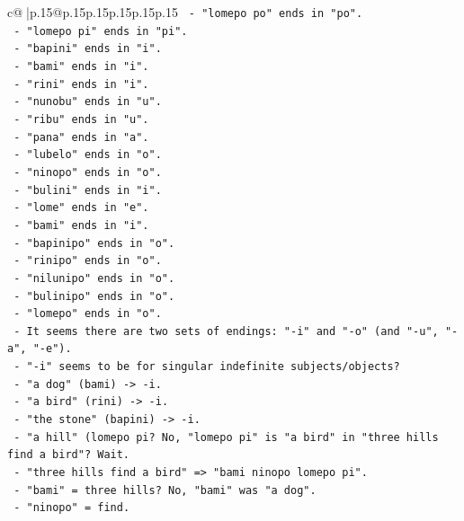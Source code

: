 \documentclass{article}
\begin{document}
{\begin{supertabular}{c@{$\;$}|p{.15\linewidth}@{}p{.15\linewidth}p{.15\linewidth}p{.15\linewidth}p{.15\linewidth}p{.15\linewidth}}
{{{\texttt{           {-} "lomepo po" ends in "po".} \\
\texttt{           {-} "lomepo pi" ends in "pi".} \\
\texttt{           {-} "bapini" ends in "i".} \\
\texttt{           {-} "bami" ends in "i".} \\
\texttt{           {-} "rini" ends in "i".} \\
\texttt{           {-} "nunobu" ends in "u".} \\
\texttt{           {-} "ribu" ends in "u".} \\
\texttt{           {-} "pana" ends in "a".} \\
\texttt{           {-} "lubelo" ends in "o".} \\
\texttt{           {-} "ninopo" ends in "o".} \\
\texttt{           {-} "bulini" ends in "i".} \\
\texttt{           {-} "lome" ends in "e".} \\
\texttt{           {-} "bami" ends in "i".} \\
\texttt{           {-} "bapinipo" ends in "o".} \\
\texttt{           {-} "rinipo" ends in "o".} \\
\texttt{           {-} "nilunipo" ends in "o".} \\
\texttt{           {-} "bulinipo" ends in "o".} \\
\texttt{           {-} "lomepo" ends in "o".} \\
\texttt{           {-} It seems there are two sets of endings: "{-}i" and "{-}o" (and "{-}u", "{-}a", "{-}e").} \\
\texttt{           {-} "{-}i" seems to be for singular indefinite subjects/objects?} \\
\texttt{             {-} "a dog" (bami) {-}> {-}i.} \\
\texttt{             {-} "a bird" (rini) {-}> {-}i.} \\
\texttt{             {-} "the stone" (bapini) {-}> {-}i.} \\
\texttt{             {-} "a hill" (lomepo pi? No, "lomepo pi" is "a bird" in "three hills find a bird"? Wait.} \\
\texttt{             {-} "three hills find a bird" => "bami ninopo lomepo pi".} \\
\texttt{               {-} "bami" = three hills? No, "bami" was "a dog".} \\
\texttt{               {-} "ninopo" = find.} \\
}}}
\end{supertabular}}
\end{document}
